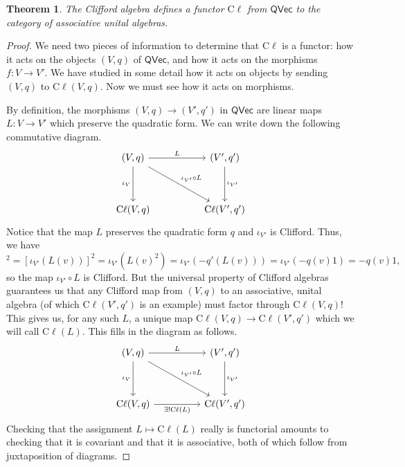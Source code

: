 \documentclass[a4paper,10pt]{scrreprt}
\newcommand{\cliff}{\mathrm{C}\ell}
\theoremstyle{definition}
\theoremstyle{plain}
\newtheorem{theorem}{Theorem}[section]
\theoremstyle{remark}
\begin{document}
\begin{theorem}
  \label{thm:cliffordmapisafunctor}
  The Clifford algebra defines a functor $\cliff$ from $\mathsf{QVec}$ to the category of associative unital algebras.
\end{theorem}
\begin{proof}
  We need two pieces of information to determine that $\cliff$ is a functor: how it acts on the objects $(V,q)$ of $\mathsf{QVec}$, and how it acts on the morphisms $f\colon V \to V'$. We have studied in some detail how it acts on objects by sending $(V,q)$ to $\cliff(V,q)$. Now we must see how it acts on morphisms.

  By definition, the morphisms $(V,q) \to (V', q')$ in $\mathsf{QVec}$ are linear maps $L\colon V \to V'$ which preserve the quadratic form. We can write down the following commutative diagram.
  \begin{equation*}
    \begin{tikzcd}[row sep=huge, column sep=huge]
      {(V,q)} \arrow[dr, "\iota_{V'} \circ L"] \arrow[d, swap, "\iota_{V}"] \arrow[r, "L"] & {(V', q')} \arrow[d, "\iota_{V'}"] \\
      {\cliff(V,q)} & {\cliff(V', q')}
    \end{tikzcd}
  \end{equation*}
  Notice that the map $L$ preserves the quadratic form $q$ and $\iota_{V'}$ is Clifford. Thus, we have 
  \begin{equation*}
    [(\iota_{V'} \circ L)(v)]^{2} = [\iota_{V'}(L(v))]^2 = \iota_{V'}(L(v)^2) = \iota_{V'}(-q'(L(v))) = \iota_{V'}(-q(v)1) = -q(v) 1,
  \end{equation*}
  so the map $\iota_{V'} \circ L$ is Clifford. But the universal property of Clifford algebras guarantees us that any Clifford map from $(V,q)$ to an associative, unital algebra (of which $\cliff(V', q')$ is an example) must factor through $\cliff(V,q)$! This gives us, for any such $L$, a unique map $\cliff(V,q) \to \cliff(V', q')$ which we will call $\cliff(L)$. This fills in the diagram as follows.
  \begin{equation*}
    \begin{tikzcd}[row sep=huge, column sep=huge]
      {(V,q)} \arrow[dr, "\iota_{V'} \circ L"] \arrow[d, swap, "\iota_{V}"] \arrow[r, "L"] & {(V', q')} \arrow[d, "\iota_{V'}"] \\
      {\cliff(V,q)} \arrow[r, swap, "\exists!\cliff(L)"] & {\cliff(V', q')}
    \end{tikzcd}
  \end{equation*}
  Checking that the assignment $L \mapsto \cliff(L)$ really is functorial amounts to checking that it is covariant and that it is associative, both of which follow from juxtaposition of diagrams.
\end{proof}
\end{document}
